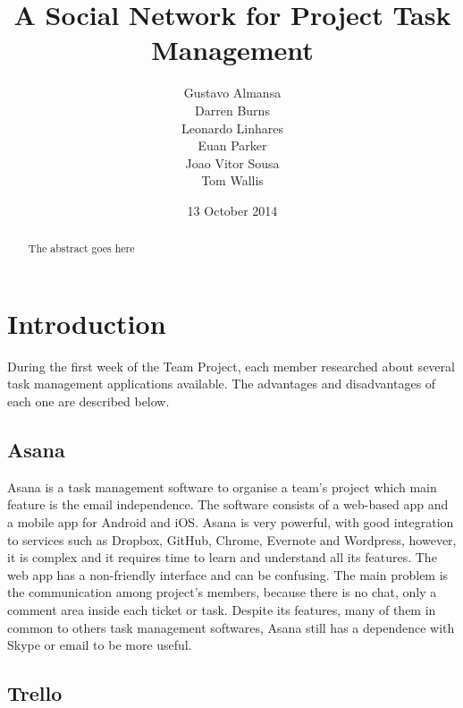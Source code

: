 \documentclass{l3proj}
\begin{document}
\title{A Social Network for Project Task Management}
\author{Gustavo Almansa\\
        Darren Burns \\
        Leonardo Linhares \\
        Euan Parker \\
        Joao Vitor Sousa \\
	Tom Wallis \\
}
\date{13 October 2014}
\maketitle
\begin{abstract}

The abstract goes here

\end{abstract}
\educationalconsent
\tableofcontents
\chapter{Introduction}
\label{intro}

During the first week of the Team Project, each member researched about several
task management applications available. The advantages and disadvantages of each
one are described below.

\section{Asana} 
\label{asana}

Asana is a task management software to organise a team's project which main
feature is the email independence. The software consists of a web-based app and
a mobile app for Android and iOS. Asana is very powerful, with good integration
to services such as Dropbox, GitHub, Chrome, Evernote and Wordpress, however, it
is complex and it requires time to learn and understand all its features. The
web app has a non-friendly interface and can be confusing. The main problem is
the communication among project’s members, because there is no chat, only a
comment area inside each ticket or task. Despite its features, many of them in
common to others task management softwares, Asana still has a dependence with
Skype or email to be more useful.

\section{Trello}
\label{trello}
\end{document}
